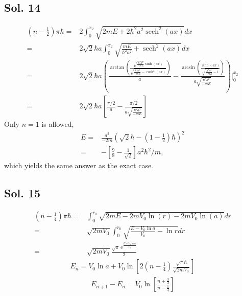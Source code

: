 \subsection*{Sol. 14}
\begin{align*}
    (n-\frac{1}{2})\pi\hbar=&
    2\int_0^{x_2}\sqrt{2mE + 2\hbar^2a^2\operatorname{sech}^2(ax)}
    dx\\
    =&
    2\sqrt{2}\hbar a
    \int_0^{x_2}\sqrt{\frac{mE}{\hbar^2 a^2} + \operatorname{sech}^2(ax)}
    dx\\
    =&
    2\sqrt{2}\hbar a\left(\frac{\arctan\left(\frac{\sqrt{\frac{\hbar^2 a^2}{-mE}} \sinh\left(ax\right)}{\sqrt{\frac{\hbar^2 a^2}{-mE} - \cosh^{2}\left(ax\right)}}\right)}{a} - \frac{\arcsin\left(\frac{\sinh\left(ax\right)}{\sqrt{\frac{\hbar^2 a^2}{-mE} - 1}}\right)}{a \sqrt{\frac{\hbar^2 a^2}{-mE}}}\right)\bigg|^{x_2}_0\\
    =&
    2\sqrt{2}\hbar a\left[\frac{\pi/2}{a}-
    \frac{\pi/2}{a \sqrt{\frac{\hbar^2 a^2}{-mE}}}\right]
\end{align*}
Only $n=1$ is allowed,
\begin{align*}
    E=&\frac{a^2}{-2m}(\sqrt{2}\hbar -(1-\frac{1}{2})\hbar)^2\\
    =&-\left[\frac{9}{8}-\frac{1}{\sqrt{2}}\right]a^2\hbar^2/m,
\end{align*}
which yields the same answer as the exact case.

\subsection*{Sol. 15}
\begin{align*}
    (n-\frac{1}{4})\pi\hbar=&
    \int_0^{r_0}
    \sqrt{2mE-2mV_0\ln(r)-2mV_0\ln(a)}dr\\
    =&
    \sqrt{2mV_0}
    \int_0^{r_0}
    \sqrt{
    \frac{E - V_0\ln a}{V_0}
    -\ln r
    }dr\\
    =&
    \sqrt{2mV_0}
    \frac{\sqrt{\pi} \, \mathrm{e}^{\frac{E - V_0\ln a}{V_0}}}{2}
\end{align*}
\begin{align*}
    E_n =
    V_0\ln a+
    V_0
    \ln\left[2(n-\frac{1}{4})
    \frac{\sqrt{\pi}\hbar}{\sqrt{2mV_0}}\right]
\end{align*}
\begin{align*}
    E_{n+1}
    -E_n
    =
    V_0
    \ln\left[
    \frac{n+\frac{3}{4}}{n-\frac{1}{4}}
    \right]
\end{align*}

